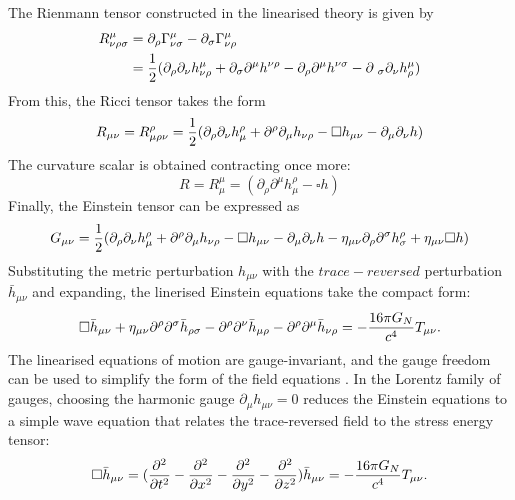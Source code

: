 \documentclass[binding=0.6cm, LaM]{sapthesis}
\begin{document}
	The Rienmann tensor constructed in the linearised theory is given by
		\begin{align}
			R^{\mu}_{\nu\rho\sigma} &= \partial_{\rho} \Gamma^{\mu}_{\nu\sigma} - \partial_{\sigma}\Gamma^{\mu}_{\nu\rho}  \\
				       &= {1 \over 2} (\partial_{\rho}\partial_{\nu}h^{\mu}_{\nu\rho} + \partial_{\sigma}\partial^{\mu}h^{\nu\rho} - \partial_{\rho}\partial^{\mu}h^{\nu\sigma} - \partial_{\					     \sigma}\partial_{\nu}h^{\mu}_{\rho})
		\end{align}
	From this, the Ricci tensor takes the form
		\begin{equation}
			R_{\mu\nu} = R^{\rho}_{\mu\rho\nu} = {1 \over 2}(\partial_{\rho}\partial_{\nu}h^{\rho}_{\mu} + \partial^{\rho}\partial_{\mu}h_{\nu\rho} - \square h_{\mu\nu} - \partial_{\mu}\partial_{\nu}h)
		\end{equation}
	The curvature scalar is obtained contracting once more:
		\begin{equation}
			R = R^{\mu}_{\mu} = (\partial_{\rho}\partial^{\mu}h^{\rho}_{\mu} - \square h)
		\end{equation}
	Finally, the Einstein tensor can be expressed as
		\begin{equation}
			G_{\mu\nu} = {1 \over 2}(\partial_{\rho}\partial_{\nu}h^{\rho}_{\mu} + \partial^{\rho}\partial_{\mu}h_{\nu\rho} - \square h_{\mu\nu} - \partial_{\mu}\partial_{\nu}h - \eta_{\mu\nu}\partial_{\rho}\partial^{\sigma}h^{\rho}_{\sigma} + \eta_{\mu\nu}\square h)
		\end{equation}
	Substituting the metric perturbation $h_{\mu\nu}$  with the $trace-reversed$ perturbation ${\bar h}_{\mu\nu}$ and expanding, 
	the linerised Einstein equations take the compact form:
		\begin{equation}
			\square {\bar h}_{\mu\nu} + \eta_{\mu\nu}{\partial}^{\rho}{\partial}^{\sigma}{\bar h}_{\rho\sigma} - {\partial}^{\rho}{\partial}^{\nu}{\bar h}_{\mu\rho} - {\partial}^{\rho}{\partial}^{\mu}{\bar h}_{\nu\rho} = - {{16\pi G_{N}} \over {c^4}}T_{\mu\nu}.
		\end{equation}
	The linearised equations of motion are gauge-invariant, and the gauge freedom can
 	be used to simplify the form of the field equations \cite{17}.
 	In the Lorentz family of gauges, choosing the harmonic gauge $ \partial_{\mu}h_{\mu\nu} = 0 $ 
	reduces the Einstein equations to a simple wave equation that relates the trace-reversed field
 	to the stress energy tensor:
		\begin{equation}
			\label{reduceinstein}
			\square {\bar h}_{\mu\nu} =({\partial^2 \over {\partial t^2} } - {\partial^2 \over {\partial x^2}}  - {\partial^2 \over {\partial y^2}}  -  {\partial^2 \over {\partial z^2}}) {\bar h}_{\mu\nu} = -{{16\pi G_{N}} \over {c^4}}T_{\mu\nu}. 
		\end{equation}
\end{document}
